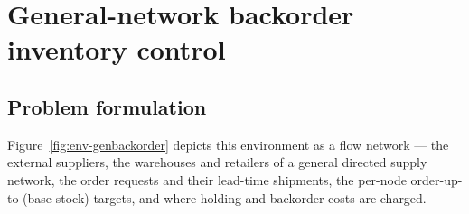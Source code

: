 \documentclass[11pt]{article}
\begin{document}
%

\section{General-network backorder inventory control}
\label{sec:genbackorder}

\subsection{Problem formulation}
\label{sec:genbackorder-formulation}

Figure~\ref{fig:env-genbackorder} depicts this environment as a flow network --- the external
suppliers, the warehouses and retailers of a general directed supply network, the order requests and
their lead-time shipments, the per-node order-up-to (base-stock) targets, and where holding and
backorder costs are charged.
\end{document}
